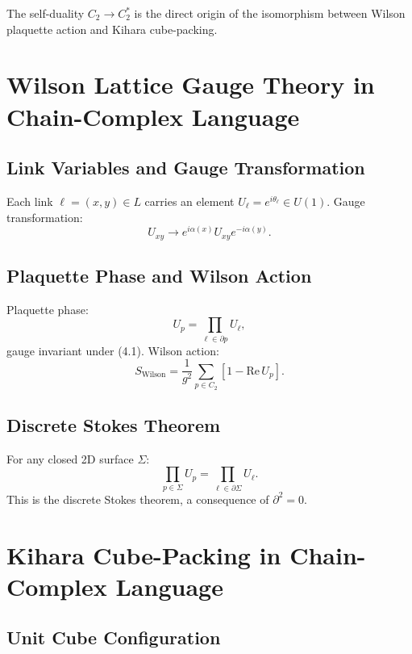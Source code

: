 \documentclass[a4paper,11pt]{article}
\begin{document}
The self-duality $C_2 \to C_2^*$ is the direct origin of the isomorphism between Wilson plaquette action and Kihara cube-packing.

\section{Wilson Lattice Gauge Theory in Chain-Complex Language}

\subsection{Link Variables and Gauge Transformation}

Each link $\ell = (x, y) \in L$ carries an element $U_\ell = e^{i\theta_\ell} \in U(1)$. Gauge transformation:
\begin{equation}
U_{xy} \to e^{i\alpha(x)} U_{xy} e^{-i\alpha(y)}. \tag{4.1}
\end{equation}

\subsection{Plaquette Phase and Wilson Action}

Plaquette phase:
\begin{equation}
U_p = \prod_{\ell \in \partial p} U_\ell, \tag{4.2}
\end{equation}
gauge invariant under (4.1). Wilson action:
\begin{equation}
S_{\text{Wilson}} = \frac{1}{g^2} \sum_{p \in C_2} \left[1 - \text{Re}\, U_p\right]. \tag{4.3}
\end{equation}

\subsection{Discrete Stokes Theorem}

For any closed 2D surface $\Sigma$:
\begin{equation}
\prod_{p \in \Sigma} U_p = \prod_{\ell \in \partial \Sigma} U_\ell. \tag{4.4}
\end{equation}
This is the discrete Stokes theorem, a consequence of $\partial^2 = 0$.

\section{Kihara Cube-Packing in Chain-Complex Language}

\subsection{Unit Cube Configuration}
\end{document}
